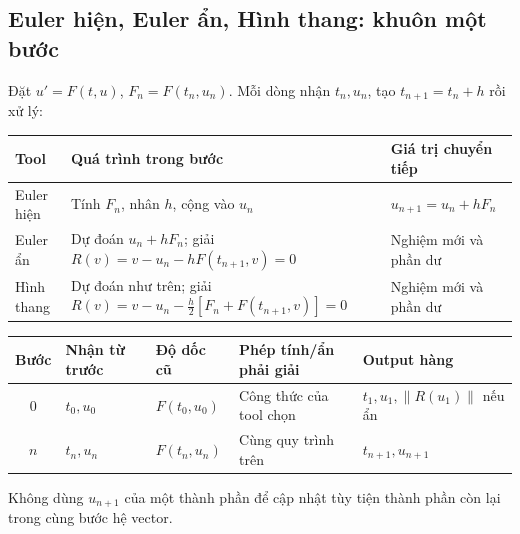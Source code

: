 \subsection{Euler hiện, Euler ẩn, Hình thang: khuôn một bước}
Đặt $u'=F(t,u)$, $F_n=F(t_n,u_n)$. Mỗi dòng nhận $t_n,u_n$, tạo $t_{n+1}=t_n+h$ rồi xử lý:
\begin{center}\small\begin{tabular}{@{}p{.21\linewidth}p{.43\linewidth}p{.27\linewidth}@{}}\toprule
Tool&Quá trình trong bước&Giá trị chuyển tiếp\\\midrule
Euler hiện&Tính $F_n$, nhân $h$, cộng vào $u_n$&$u_{n+1}=u_n+hF_n$\\
Euler ẩn&Dự đoán $u_n+hF_n$; giải $R(v)=v-u_n-hF(t_{n+1},v)=0$&Nghiệm mới và phần dư\\
Hình thang&Dự đoán như trên; giải $R(v)=v-u_n-\frac h2[F_n+F(t_{n+1},v)]=0$&Nghiệm mới và phần dư\\\bottomrule
\end{tabular}\end{center}
\begin{center}\small\begin{tabular}{cllll}\toprule
Bước&Nhận từ trước&Độ dốc cũ&Phép tính/ẩn phải giải&Output hàng\\\midrule
0&$t_0,u_0$&$F(t_0,u_0)$&Công thức của tool chọn&$t_1,u_1,\|R(u_1)\|$ nếu ẩn\\
$n$&$t_n,u_n$&$F(t_n,u_n)$&Cùng quy trình trên&$t_{n+1},u_{n+1}$\\\bottomrule
\end{tabular}\end{center}
Không dùng $u_{n+1}$ của một thành phần để cập nhật tùy tiện thành phần còn lại trong cùng bước hệ vector.

